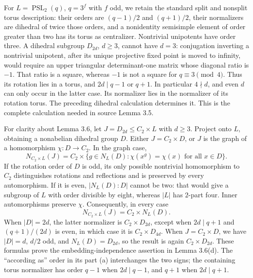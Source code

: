 \documentclass[11pt,a4paper]{article}
\begin{document}
For $L=\operatorname{PSL}_2(q)$, $q=3^f$ with $f$ odd, we retain
the standard split and nonsplit torus description: their orders are
$(q-1)/2$ and $(q+1)/2$, their normalizers are dihedral of twice
those orders, and a nonidentity semisimple element of order greater
than two has its torus as centralizer. Nontrivial unipotents have
order three. A dihedral subgroup $D_{2d}$, $d\ge3$, cannot have
$d=3$: conjugation inverting a nontrivial unipotent, after its unique
projective fixed point is moved to infinity, would require an upper
triangular determinant-one matrix whose diagonal ratio is $-1$.
That ratio is a square, whereas $-1$ is not a square for
$q\equiv3\pmod4$. Thus its rotation lies in a torus, and
$2d\mid q-1$ or $q+1$. In particular $4\nmid d$, and even $d$ can
only occur in the latter case. Its normalizer lies in the normalizer
of its rotation torus. The preceding dihedral calculation determines
it. This is the complete calculation needed in source Lemma 3.5.

For clarity about Lemma 3.6, let $J=D_{2d}\le C_2\times L$ with
$d\ge3$. Project onto $L$, obtaining a nonabelian dihedral group $D$.
Either $J=C_2\times D$, or $J$ is the graph of a homomorphism
$\chi:D\to C_2$. In the graph case,
\[
 N_{C_2\times L}(J)
 =C_2\times\{g\in N_L(D):\chi(x^g)=\chi(x)\text{ for all }x\in D\}.
\]
If the rotation order of $D$ is odd, its only possible nontrivial
homomorphism to $C_2$ distinguishes rotations and reflections and is
preserved by every automorphism. If it is even, $|N_L(D):D|$ cannot
be two: that would give a subgroup of $L$ with order divisible by
eight, whereas $|L|$ has $2$-part four. Inner automorphisms preserve
$\chi$. Consequently, in every case
\[
 N_{C_2\times L}(J)=C_2\times N_L(D).
\]
When $|D|=2d$, the latter normalizer is $C_2\times D_{2d}$, except
when $2d\mid q+1$ and $(q+1)/(2d)$ is even, in which case it is
$C_2\times D_{4d}$. When $J=C_2\times D$, we have $|D|=d$, $d/2$
odd, and $N_L(D)=D_{2d}$, so the result is again $C_2\times D_{2d}$.
These formulas prove the embedding-independence assertion in
Lemma 3.6(d). The ``according as'' order in its part (a) interchanges
the two signs; the containing torus normalizer has order $q-1$
when $2d\mid q-1$, and $q+1$ when $2d\mid q+1$.
\end{document}

